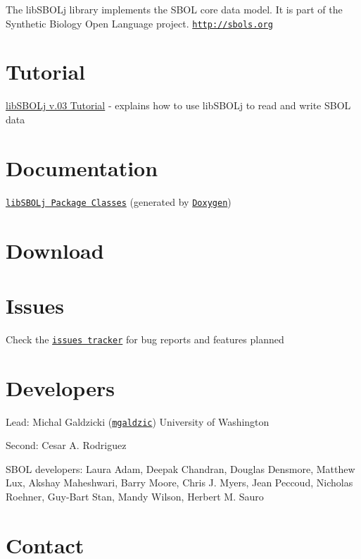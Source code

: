 The libSBOLj library implements the SBOL core data model. It is part of the Synthetic Biology Open Language project. \href{http://sbols.org}{\tt http://sbols.org} \hypertarget{index_tutorial_sec}{}\section{Tutorial}\label{index_tutorial_sec}

\begin{DoxyItemize}
\item \hyperlink{tutorial}{libSBOLj v.03 Tutorial} -\/ explains how to use libSBOLj to read and write SBOL data
\end{DoxyItemize}\hypertarget{index_doc_sec}{}\section{Documentation}\label{index_doc_sec}

\begin{DoxyItemize}
\item \href{annotated.html}{\tt libSBOLj Package Classes} (generated by \href{http://www.stack.nl/~dimitri/doxygen/}{\tt Doxygen})
\end{DoxyItemize}\hypertarget{index_download_sec}{}\section{Download}\label{index_download_sec}
\hypertarget{index_issues_sec}{}\section{Issues}\label{index_issues_sec}

\begin{DoxyItemize}
\item Check the \href{https://github.com/mgaldzic/libSBOLj/issues}{\tt issues tracker} for bug reports and features planned
\end{DoxyItemize}\hypertarget{index_author_sec}{}\section{Developers}\label{index_author_sec}

\begin{DoxyItemize}
\item Lead: Michal Galdzicki (\href{http://github.com/mgaldzic}{\tt mgaldzic}) University of Washington
\item Second: Cesar A. Rodriguez
\item SBOL developers: Laura Adam, Deepak Chandran, Douglas Densmore, Matthew Lux, Akshay Maheshwari, Barry Moore, Chris J. Myers, Jean Peccoud, Nicholas Roehner, Guy-\/Bart Stan, Mandy Wilson, Herbert M. Sauro
\end{DoxyItemize}\hypertarget{index_contact_sec}{}\section{Contact}\label{index_contact_sec}

